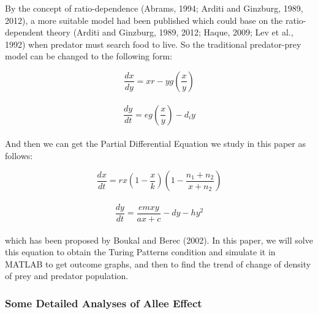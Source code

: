 \documentclass[12pt]{article}
\begin{document}
\noindent By the concept of ratio-dependence (Abrams, 1994; Arditi and Ginzburg, 1989, 2012), a more suitable model had been published which could base on the ratio-dependent theory (Arditi and Ginzburg, 1989, 2012; Haque, 2009; Lev et al., 1992) when predator must search food to live. So the traditional predator-prey model can be changed to the following form:

$$\frac{dx}{dy}=xr-yg(\frac{x}{y})$$\\
$$\frac{dy}{dt}=eg(\frac{x}{y})-d_iy$$\\

\noindent And then we can get the Partial Differential Equation we study in this paper as follows:

\vspace{12pt}

$$\frac{dx}{dt}=rx(1-\frac{x}{k})(1-\frac{n_1+n_2}{x+n_2})$$\\
$$\frac{dy}{dt}=\frac{emxy}{ax+c}-dy-hy^2$$\\

\noindent which has been proposed by Boukal and Berec (2002). In this paper, we will solve this equation to obtain the Turing Patterns condition and simulate it in MATLAB to get outcome graphs, and then to find the trend of change of density of prey and predator population.

\vspace{24pt}

\subsubsection{Some Detailed Analyses of Allee Effect}
\end{document}
